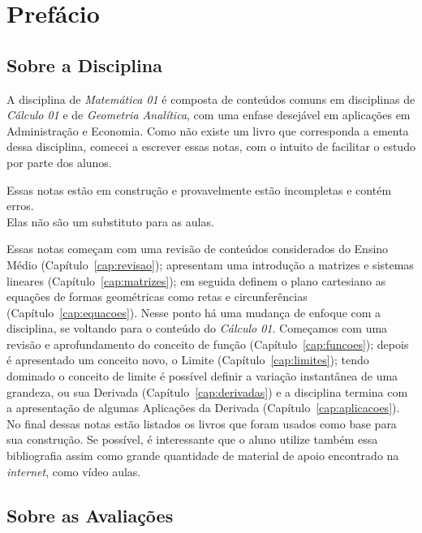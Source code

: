 \chapter*{Prefácio}

\section*{Sobre a Disciplina}

A disciplina de \emph{Matemática 01} é composta de conteúdos comuns em disciplinas de \emph{Cálculo 01} e
de \emph{Geometria Analítica}, com uma enfase desejável em aplicações em Administração e Economia.
Como não existe um livro que corresponda a ementa dessa disciplina, comecei a escrever essas notas,
com o intuito de facilitar o estudo por parte dos alunos.

\begin{observation}
    Essas notas estão em construção e provavelmente estão incompletas e contém erros. \\
    Elas não são um substituto para as aulas.
\end{observation}

Essas notas começam com uma revisão de conteúdos considerados do Ensino Médio (Capítulo~\ref{cap:revisao});
apresentam uma introdução a matrizes e sistemas lineares (Capítulo~\ref{cap:matrizes});
em seguida definem o plano cartesiano as equações de formas geométricas como retas e circunferências (Capítulo~\ref{cap:equacoes}).
Nesse ponto há uma mudança de enfoque com a disciplina, se voltando para o conteúdo do \emph{Cálculo 01}.
Começamos com uma revisão e aprofundamento do conceito de função (Capítulo~\ref{cap:funcoes});
depois é apresentado um conceito novo, o Limite (Capítulo~\ref{cap:limites});
tendo dominado o conceito de limite é possível definir a variação instantânea de uma grandeza, ou sua Derivada (Capítulo~\ref{cap:derivadas}) e
a disciplina termina com a apresentação de algumas Aplicações da Derivada (Capítulo~\ref{cap:aplicacoes}).
No final dessas notas estão listados os livros que foram usados como base para sua construção.
Se possível, é interessante que o aluno utilize também essa bibliografia assim como grande quantidade
de material de apoio encontrado na \emph{internet}, como vídeo aulas.

\section*{Sobre as Avaliações}

